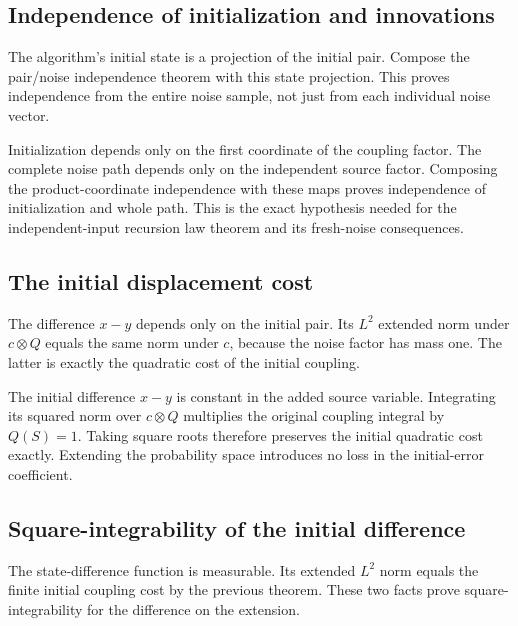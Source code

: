 \documentclass[11pt,a4paper]{article}
\begin{document}
\subsection{\texorpdfstring{Independence of initialization and innovations}{Independence of initialization and innovations}}


The algorithm's initial state is a projection of the initial pair. Compose the pair/\allowbreak{}noise independence theorem with this state projection. This proves independence from the entire noise sample, not just from each individual noise vector.



Initialization depends only on the first coordinate of the coupling factor. The complete noise path depends only on the independent source factor. Composing the product-coordinate independence with these maps proves independence of initialization and whole path. This is the exact hypothesis needed for the independent-input recursion law theorem and its fresh-noise consequences.


\subsection{\texorpdfstring{The initial displacement cost}{The initial displacement cost}}


The difference \(x-y\) depends only on the initial pair. Its \(L^2\) extended norm under \(c\otimes Q\) equals the same norm under \(c\), because the noise factor has mass one. The latter is exactly the quadratic cost of the initial coupling.



The initial difference \(x-y\) is constant in the added source variable. Integrating its squared norm over \(c\otimes Q\) multiplies the original coupling integral by \(Q(S)=1\). Taking square roots therefore preserves the initial quadratic cost exactly. Extending the probability space introduces no loss in the initial-error coefficient.


\subsection{\texorpdfstring{Square-integrability of the initial difference}{Square-integrability of the initial difference}}


The state-difference function is measurable. Its extended \(L^2\) norm equals the finite initial coupling cost by the previous theorem. These two facts prove square-integrability for the difference on the extension.
\end{document}
